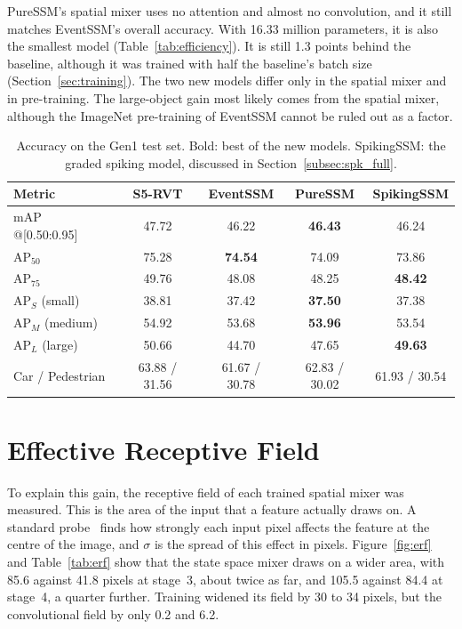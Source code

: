 \documentclass[11pt, a4paper]{report}
\begin{document}
PureSSM's spatial mixer uses no attention and almost no convolution, and it still matches EventSSM's overall
accuracy. With 16.33 million parameters, it is also the smallest model (Table~\ref{tab:efficiency}). It is
still 1.3 points behind the baseline, although it was trained with half the baseline's batch size
(Section~\ref{sec:training}). The two new models differ only in the spatial mixer and in pre-training. The large-object gain most likely
comes from the spatial mixer, although the ImageNet pre-training of EventSSM cannot be ruled out as a factor.

\begin{table}[htbp]
\centering
\caption[Test accuracy of all models]{Accuracy on the Gen1 test set. Bold: best of the new models.
    SpikingSSM: the graded spiking model, discussed in Section~\ref{subsec:spk_full}.}
\label{tab:accuracy}
\label{tab:spiking_400k}
\begin{tabular}{lcccc}
\toprule
\textbf{Metric} & \textbf{S5-RVT} & \textbf{EventSSM} & \textbf{PureSSM} & \textbf{SpikingSSM} \\
\midrule
mAP @[0.50:0.95]        & 47.72 & 46.22 & \textbf{46.43} & 46.24 \\
$\mathrm{AP}_{50}$      & 75.28 & \textbf{74.54} & 74.09 & 73.86 \\
$\mathrm{AP}_{75}$      & 49.76 & 48.08 & 48.25 & \textbf{48.42} \\
$\mathrm{AP}_S$ (small) & 38.81 & 37.42 & \textbf{37.50} & 37.38 \\
$\mathrm{AP}_M$ (medium)& 54.92 & 53.68 & \textbf{53.96} & 53.54 \\
$\mathrm{AP}_L$ (large) & 50.66 & 44.70 & 47.65 & \textbf{49.63} \\
\midrule
Car / Pedestrian        & 63.88 / 31.56 & 61.67 / 30.78 & 62.83 / 30.02 & 61.93 / 30.54 \\
\bottomrule
\end{tabular}
\end{table}

\section{Effective Receptive Field}
\label{sec:erf}
To explain this gain, the receptive field of each trained spatial mixer was measured. This is the area of the input that a feature actually draws on. A standard probe~\cite{luo2016understanding} finds how strongly each input
pixel affects the feature at the centre of the image, and $\sigma$ is the spread of this effect in pixels.
Figure~\ref{fig:erf} and Table~\ref{tab:erf} show that the state space mixer draws on a wider area, with 85.6 against 41.8 pixels at stage~3, about twice as far, and 105.5 against 84.4 at stage~4, a quarter
further. Training widened its field by 30 to 34 pixels, but the convolutional field by only 0.2 and 6.2.
\end{document}

